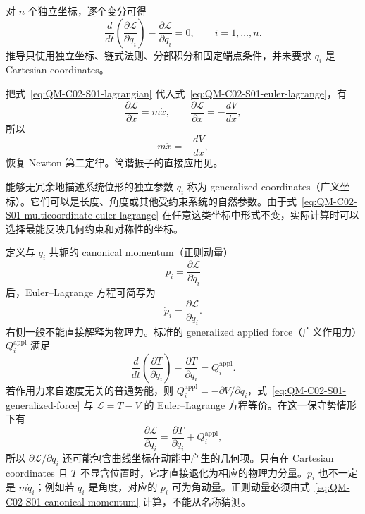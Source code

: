 对 $n$ 个独立坐标，逐个变分可得
\begin{equation}
  \boxed{
  \frac{d}{dt}
  \left(\frac{\partial\mathcal L}{\partial\dot q_i}\right)
  -\frac{\partial\mathcal L}{\partial q_i}=0,
  \qquad i=1,\ldots,n.}
  \label{eq:QM-C02-S01-multicoordinate-euler-lagrange}
\end{equation}
推导只使用独立坐标、链式法则、分部积分和固定端点条件，并未要求 $q_i$ 是 Cartesian coordinates。

把式~\eqref{eq:QM-C02-S01-lagrangian} 代入式~\eqref{eq:QM-C02-S01-euler-lagrange}，有
\[
  \frac{\partial\mathcal L}{\partial\dot x}=m\dot x,
  \qquad
  \frac{\partial\mathcal L}{\partial x}=-\frac{dV}{dx},
\]
所以
\[
  m\ddot x=-\frac{dV}{dx},
\]
恢复 Newton 第二定律。简谐振子的直接应用见。


能够无冗余地描述系统位形的独立参数 $q_i$ 称为 generalized coordinates（广义坐标）。它们可以是长度、角度或其他受约束系统的自然参数。由于式~\eqref{eq:QM-C02-S01-multicoordinate-euler-lagrange} 在任意这类坐标中形式不变，实际计算时可以选择最能反映几何约束和对称性的坐标。

定义与 $q_i$ 共轭的 canonical momentum（正则动量）
\begin{equation}
  \boxed{p_i=\frac{\partial\mathcal L}{\partial\dot q_i}}
  \label{eq:QM-C02-S01-canonical-momentum}
\end{equation}
后，Euler--Lagrange 方程可简写为
\begin{equation}
  \dot p_i=\frac{\partial\mathcal L}{\partial q_i}.
  \label{eq:QM-C02-S01-generalized-newton}
\end{equation}
右侧一般不能直接解释为物理力。标准的 generalized applied force（广义作用力）$Q_i^{\mathrm{appl}}$ 满足
\begin{equation}
  \boxed{
  \frac{d}{dt}\left(\frac{\partial T}{\partial\dot q_i}\right)
  -\frac{\partial T}{\partial q_i}
  =Q_i^{\mathrm{appl}}.}
  \label{eq:QM-C02-S01-generalized-force}
\end{equation}
若作用力来自速度无关的普通势能，则 $Q_i^{\mathrm{appl}}=-\partial V/\partial q_i$，式~\eqref{eq:QM-C02-S01-generalized-force} 与 $\mathcal L=T-V$ 的 Euler--Lagrange 方程等价。在这一保守势情形下有
\[
  \frac{\partial\mathcal L}{\partial q_i}
  =\frac{\partial T}{\partial q_i}+Q_i^{\mathrm{appl}},
\]
所以 $\partial\mathcal L/\partial q_i$ 还可能包含曲线坐标在动能中产生的几何项。只有在 Cartesian coordinates 且 $T$ 不显含位置时，它才直接退化为相应的物理力分量。$p_i$ 也不一定是 $m\dot q_i$；例如若 $q_i$ 是角度，对应的 $p_i$ 可为角动量。正则动量必须由式~\eqref{eq:QM-C02-S01-canonical-momentum} 计算，不能从名称猜测。

